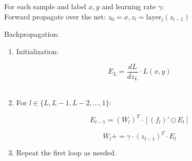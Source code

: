 \begin{mdframed}[backgroundcolor=green_background, linecolor=black, linewidth=2pt, frametitle=\textbf{Pseudo-code}]

For each sample and label \(x, y\) and learning rate \(\gamma\): \\

Forward propagate over the net:
\(z_0 = x, z_l = \text{layer}_l(z_{l-1})\)

Backpropagation: \\

\begin{enumerate}

    \item Initialization: 
    
    \[E_L = \frac{dL}{dz_L} \cdot L(x, y)\] \\

    \item For \(l \in \{L, L-1, L-2, \ldots, 1\}\):

    \[ E_{l-1} = (W_l)^T \cdot [(f_l)'\odot E_{l}] \]

    \[ W_l  += \gamma \cdot (z_{l-1})^T \cdot E_l \]

    \item Repeat the first loop as needed.


\end{enumerate}
\end{mdframed}